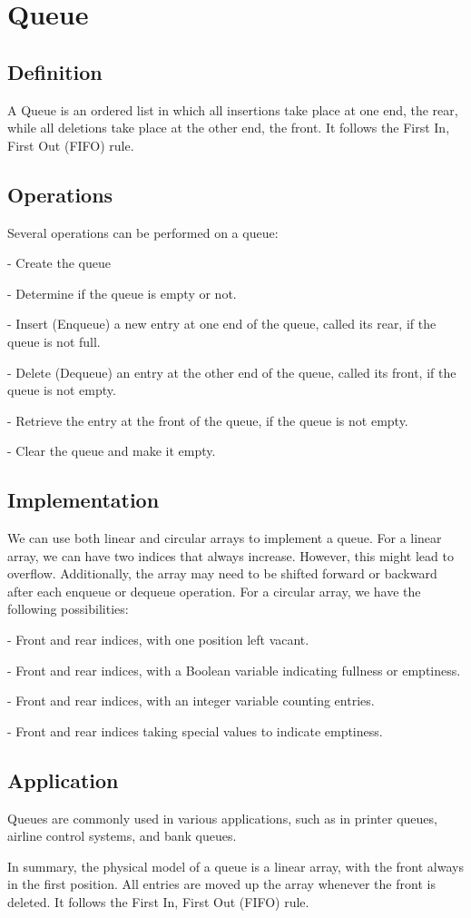 \section{Queue}
\subsection{Definition}
A Queue is an ordered list in which all insertions take place at one end, the rear, while all deletions take place at the other end, the front. It follows the First In, First Out (FIFO) rule.

\subsection{Operations}
Several operations can be performed on a queue:

- Create the queue

- Determine if the queue is empty or not.

- Insert (Enqueue) a new entry at one end of the queue, called its rear, if the queue is not full.

- Delete (Dequeue) an entry at the other end of the queue, called its front, if the queue is not empty.

- Retrieve the entry at the front of the queue, if the queue is not empty.

- Clear the queue and make it empty.

\subsection{Implementation}
We can use both linear and circular arrays to implement a queue. For a linear array, we can have two indices that always increase. However, this might lead to overflow. Additionally, the array may need to be shifted forward or backward after each enqueue or dequeue operation. For a circular array, we have the following possibilities:

- Front and rear indices, with one position left vacant.

- Front and rear indices, with a Boolean variable indicating fullness or emptiness.

- Front and rear indices, with an integer variable counting entries.

- Front and rear indices taking special values to indicate emptiness.

\subsection{Application}
Queues are commonly used in various applications, such as in printer queues, airline control systems, and bank queues.

In summary, the physical model of a queue is a linear array, with the front always in the first position. All entries are moved up the array whenever the front is deleted. It follows the First In, First Out (FIFO) rule.
